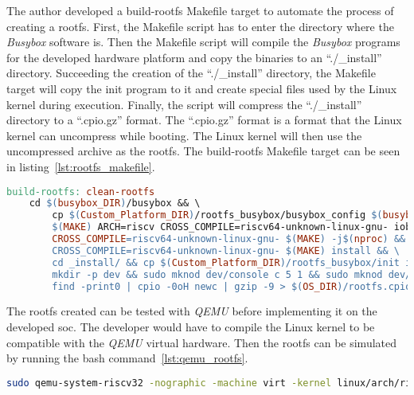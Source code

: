 The author developed a build-\acrlong{rootfs} Makefile target to automate the process of creating a \acrlong{rootfs}. First, the Makefile script has to enter the directory where the \textit{Busybox} software is. Then the Makefile script will compile the \textit{Busybox} programs for the developed hardware platform and copy the binaries to an \enquote{./\_install} directory. Succeeding the creation of the \enquote{./\_install} directory, the Makefile target will copy the init program to it and create special files used by the Linux kernel during execution. Finally, the script will compress the \enquote{./\_install} directory to a \enquote{.cpio.gz} format. The \enquote{.cpio.gz} format is a format that the Linux kernel can uncompress while booting. The Linux kernel will then use the uncompressed archive as the \acrlong{rootfs}. The build-\acrlong{rootfs} Makefile target can be seen in listing~\ref{lst:rootfs_makefile}.

\begin{lstlisting}[language=make, caption={Root file system Makefile target.}, label=lst:rootfs_makefile]
build-rootfs: clean-rootfs
    cd $(busybox_DIR)/busybox && \
        cp $(Custom_Platform_DIR)/rootfs_busybox/busybox_config $(busybox_DIR)/busybox/configs/iob_defconfig && \
        $(MAKE) ARCH=riscv CROSS_COMPILE=riscv64-unknown-linux-gnu- iob_defconfig && \
        CROSS_COMPILE=riscv64-unknown-linux-gnu- $(MAKE) -j$(nproc) && \
        CROSS_COMPILE=riscv64-unknown-linux-gnu- $(MAKE) install && \
        cd _install/ && cp $(Custom_Platform_DIR)/rootfs_busybox/init init && \
        mkdir -p dev && sudo mknod dev/console c 5 1 && sudo mknod dev/ram0 b 1 0 && \
        find -print0 | cpio -0oH newc | gzip -9 > $(OS_DIR)/rootfs.cpio.gz
\end{lstlisting}

The \acrshort{rootfs} created can be tested with \textit{QEMU} before implementing it on the developed \acrshort{soc}. The developer would have to compile the Linux kernel to be compatible with the \textit{QEMU} virtual hardware. Then the \acrshort{rootfs} can be simulated by running the bash command~\ref{lst:qemu_rootfs}.

\begin{lstlisting}[language=bash, caption={\acrlong{rootfs} \textit{QEMU} simulation.}, label=lst:qemu_rootfs]
sudo qemu-system-riscv32 -nographic -machine virt -kernel linux/arch/riscv/boot/Image -append "root=/dev/ram init=/init ro console=ttyS0" -initrd rootfs.cpio.gz -bios default
\end{lstlisting}

